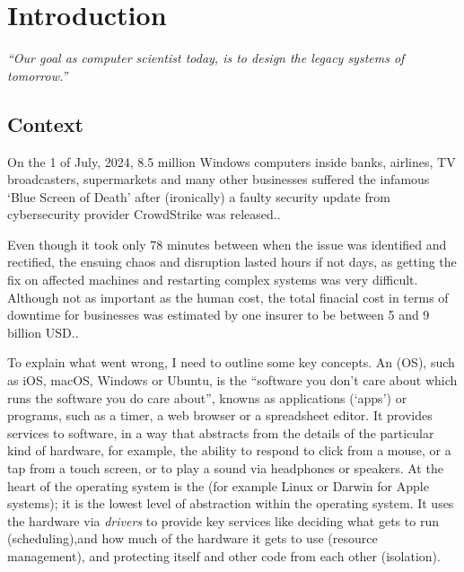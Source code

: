 \chapter{Introduction}\label{chap:intro}

\emph{“Our goal as computer scientist today, is to design the legacy systems of tomorrow.”}
\vspace{-1.5em}
\begin{flushright}
\end{flushright}

\margintoc%

\section{Context}

On the 1 of July, 2024, 8.5 million Windows computers inside banks, airlines, TV
broadcasters, supermarkets and many other businesses suffered the infamous `Blue Screen of
Death' after (ironically) a faulty security update from cybersecurity
provider CrowdStrike was released..

Even though it took only 78 minutes between when the issue was identified and
rectified, the ensuing chaos and disruption lasted hours if not days, as getting
the fix on affected machines and restarting complex systems was very difficult.
Although not as important as the human cost, the total finacial cost in terms
of downtime for businesses was estimated by one insurer to be between 5 and 9
billion USD..

To explain what went wrong, I need to outline some key concepts. An
 (OS), such as iOS, macOS, Windows or Ubuntu, is
the ``software you don't care about which runs the software you do care
about'', knowns as applications (`apps') or programs, such as a timer, a web
browser or a spreadsheet editor. It provides services to software, in a way
that abstracts from the details of the particular kind of hardware, for
example, the ability to respond to click from a mouse, or a tap from a touch
screen, or to play a sound via headphones or speakers. At the heart of the
operating system is the  (for example Linux or Darwin for
Apple systems); it is the lowest level of abstraction within the operating
system. It uses the hardware via \emph{drivers} to provide key services like
deciding what gets to run (scheduling),and how much of the hardware it gets to
use (resource management), and protecting itself and other code from each other
(isolation).

